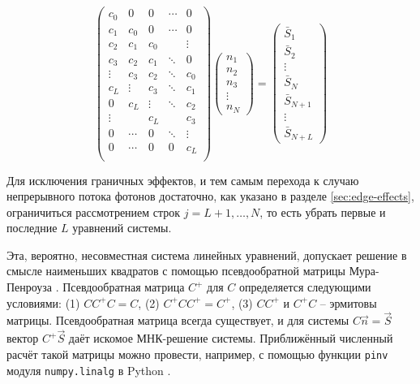 \begin{equation}
	\begin{pmatrix} 
		c_0   &  0   &  0   &\dotsm&  0     \\
		c_1   & c_0  &  0   &\dotsm&  0     \\
		c_2   & c_1  & c_0  &      & \vdots \\
		c_3   & c_2  & c_1  &\ddots&  0     \\
		\vdots& c_3  & c_2  &\ddots&  c_0   \\
		c_L   &\vdots& c_3  &\ddots&  c_1   \\
		0     & c_L  &\vdots&\ddots&  c_2   \\
		\vdots&      & c_L  &      &  c_3   \\
		0     &\dotsm&  0   &\ddots& \vdots \\
		0     &\dotsm& 0    &   0  &  c_L   \\
	\end{pmatrix}
	\begin{pmatrix} 
		n_1 \\ n_2 \\ n_3 \\ \vdots \\ n_N
	\end{pmatrix}
	=
	\begin{pmatrix} 
		\bar{S}_1 \\ \bar{S}_2 \\
		\vdots \\
		\bar{S}_N \\ \bar{S}_{N+1} \\
		\vdots \\
		\bar{S}_{N+L}
	\end{pmatrix}
	\label{eq:mean-vector-calculation}
\end{equation}

Для исключения граничных эффектов, и тем самым перехода к случаю непрерывного потока фотонов достаточно, как указано в разделе \ref{sec:edge-effects}, ограничиться рассмотрением строк $j = L+1, \ldots, N$, то есть убрать первые и последние $L$ уравнений системы.

Эта, вероятно, несовместная система линейных уравнений, допускает решение в смысле наименьших квадратов с помощью псевдообратной матрицы Мура-Пенроуза \cite{Penrose1956}. Псевдообратная матрица $C^+$ для $C$ определяется следующими условиями: (1) $C C^+ C = C$, (2) $C^+ C C^+ = C^+$, (3) $C C^+$ и $C^+ C$ -- эрмитовы матрицы. Псевдообратная матрица всегда существует, и для системы $C\vec{n} = \vec{S}$ вектор $C^+ \vec{S}$ даёт искомое МНК-решение системы. Приближённый численный расчёт такой матрицы можно провести, например, с помощью функции \verb|pinv| модуля \verb|numpy.linalg| в Python \cite{Harris2020}.

